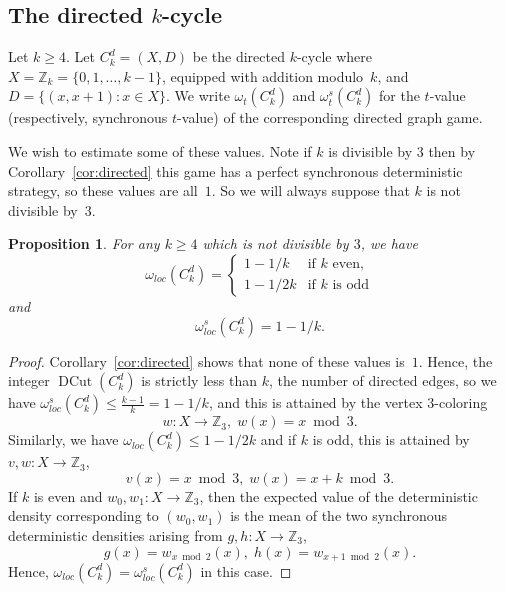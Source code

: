 \documentclass[11pt]{amsart}
\newtheorem{prop}[thm]{Proposition}
\theoremstyle{definition}
\DeclareMathOperator{\DCut}{DCut}
\newcommand{\bb}[1]{\mathbb{#1}}
\begin{document}
\subsection{The directed $k$-cycle}
Let $k\ge 4$. Let $C_k^d=(X,D)$ be the directed $k$-cycle where $X=\bb Z_k=\{0,1,\dots,k-1\}$, equipped with addition modulo~$k$, and $D=\{(x,x+1):x\in X\}$. We write $\omega_t(C_k^d)$ and $\omega_t^s(C_k^d)$ for the $t$-value (respectively, synchronous $t$-value) of the corresponding directed graph game.

We wish to estimate some of these values. Note if $k$ is divisible by $3$ then by Corollary~\ref{cor:directed} this game has a perfect synchronous deterministic strategy, so these values are all~$1$. So we will always suppose that $k$ is not divisible by~$3$.

\begin{prop}
  For any $k\ge4$ which is not divisible by $3$, we have
  \[
    \omega_{loc}(C_k^d)=\begin{cases}1-1/k&\text{if $k$ even,}\\
      1-1/2k&\text{if $k$ is odd}
    \end{cases}
  \]
  and
  \[\omega_{loc}^s(C_k^d)=1-1/k.\]
\end{prop}
\begin{proof}
  Corollary~\ref{cor:directed} shows that none of these values
  is~$1$. Hence, the integer $\DCut(C_k^d)$ is strictly less than $k$, the number of directed edges, so we have $\omega_{loc}^s(C_k^d)\le \frac{k-1}k=1-1/k$, and this is attained by the vertex $3$-coloring \[w:X\to \bb Z_3,\; w(x)=x\bmod 3.\]
  Similarly, we have $\omega_{loc}(C_k^d)\le 1-1/2k$ and if $k$ is odd, this is attained by $v,w:X\to \bb Z_3$,
  \[ v(x)=x\bmod 3,\;w(x)=x+k\bmod 3.\]
  If $k$ is even and $w_0,w_1:X\to \bb Z_3$, then the expected value of the deterministic density corresponding to $(w_0,w_1)$ is the mean of the two synchronous deterministic densities arising from $g,h:X\to \bb Z_3$,
  \[ g(x)=w_{x\bmod 2}(x),\; h(x)=w_{x+1\bmod 2}(x).\]
  Hence, $\omega_{loc}(C_k^d)=\omega_{loc}^s(C_k^d)$ in this case.
\end{proof}
\end{document}
